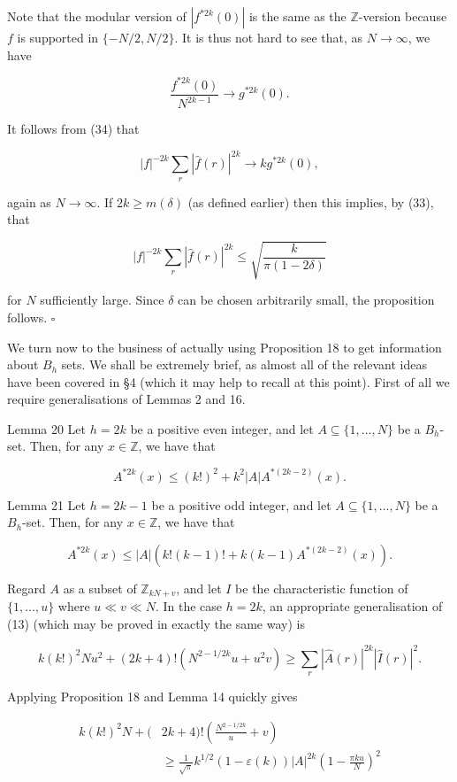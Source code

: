 \documentclass[10pt]{article}
\begin{document}
Note that the modular version of $\left|f^{* 2 k}(0)\right|$ is the same as the $\mathbb{Z}$-version because $f$ is supported in $\{-N / 2, N / 2\}$. It is thus not hard to see that, as $N \rightarrow \infty$, we have

$$
\frac{f^{* 2 k}(0)}{N^{2 k-1}} \longrightarrow g^{* 2 k}(0) .
$$

It follows from (34) that

$$
|f|^{-2 k} \sum_{r}|\hat{f}(r)|^{2 k} \longrightarrow k g^{* 2 k}(0),
$$

again as $N \rightarrow \infty$. If $2 k \geq m(\delta)$ (as defined earlier) then this implies, by (33), that

$$
|f|^{-2 k} \sum_{r}|\hat{f}(r)|^{2 k} \leq \sqrt{\frac{k}{\pi(1-2 \delta)}}
$$

for $N$ sufficiently large. Since $\delta$ can be chosen arbitrarily small, the proposition follows. \(\square\)

We turn now to the business of actually using Proposition 18 to get information about $B_{h}$ sets. We shall be extremely brief, as almost all of the relevant ideas have been covered in §4 (which it may help to recall at this point). First of all we require generalisations of Lemmas 2 and 16.

Lemma 20 Let $h=2 k$ be a positive even integer, and let $A \subseteq\{1, \ldots, N\}$ be a $B_{h}$-set. Then, for any $x \in \mathbb{Z}$, we have that

$$
A^{* 2 k}(x) \leq(k!)^{2}+k^{2}|A| A^{*(2 k-2)}(x) .
$$

Lemma 21 Let $h=2 k-1$ be a positive odd integer, and let $A \subseteq\{1, \ldots, N\}$ be a $B_{h}$-set. Then, for any $x \in \mathbb{Z}$, we have that

$$
A^{* 2 k}(x) \leq|A|\left(k!(k-1)!+k(k-1) A^{*(2 k-2)}(x)\right) .
$$

Regard $A$ as a subset of $\mathbb{Z}_{k N+v}$, and let $I$ be the characteristic function of $\{1, \ldots, u\}$ where $u \ll v \ll N$. In the case $h=2 k$, an appropriate generalisation of (13) (which may be proved in exactly the same way) is

$$
k(k!)^{2} N u^{2}+(2 k+4)!\left(N^{2-1 / 2 k} u+u^{2} v\right) \geq \sum_{r}|\hat{A}(r)|^{2 k}|\hat{I}(r)|^{2} .
$$

Applying Proposition 18 and Lemma 14 quickly gives

$$
\begin{aligned}
k(k!)^{2} N+( & 2 k+4)!\left(\frac{N^{2-1 / 2 k}}{u}+v\right) \\
& \geq \frac{1}{\sqrt{\pi}} k^{1 / 2}(1-\varepsilon(k))|A|^{2 k}\left(1-\frac{\pi k u}{N}\right)^{2}
\end{aligned}
$$
\end{document}

